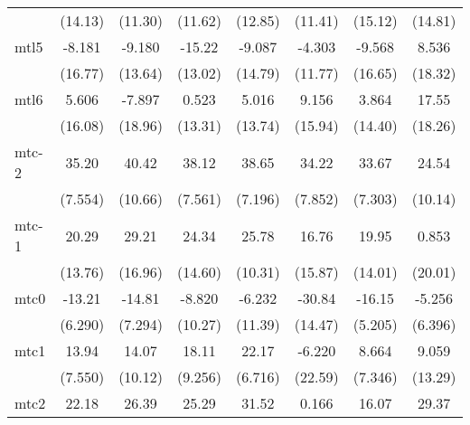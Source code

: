 \documentclass{article}
\begin{document}
{\begin{longtable}{l*{7}{c}}
                &  (14.13)         &  (11.30)         &  (11.62)         &  (12.85)         &  (11.41)         &  (15.12)         &  (14.81)         \\
mtl5            &   -8.181         &   -9.180         &   -15.22         &   -9.087         &   -4.303         &   -9.568         &    8.536         \\
                &  (16.77)         &  (13.64)         &  (13.02)         &  (14.79)         &  (11.77)         &  (16.65)         &  (18.32)         \\
mtl6            &    5.606         &   -7.897         &    0.523         &    5.016         &    9.156         &    3.864         &    17.55         \\
                &  (16.08)         &  (18.96)         &  (13.31)         &  (13.74)         &  (15.94)         &  (14.40)         &  (18.26)         \\
mtc-2           &    35.20\sym{**} &    40.42\sym{*}  &    38.12\sym{**} &    38.65\sym{**} &    34.22\sym{**} &    33.67\sym{**} &    24.54         \\
                &  (7.554)         &  (10.66)         &  (7.561)         &  (7.196)         &  (7.852)         &  (7.303)         &  (10.14)         \\
mtc-1           &    20.29         &    29.21         &    24.34         &    25.78         &    16.76         &    19.95         &    0.853         \\
                &  (13.76)         &  (16.96)         &  (14.60)         &  (10.31)         &  (15.87)         &  (14.01)         &  (20.01)         \\
mtc0            &   -13.21         &   -14.81         &   -8.820         &   -6.232         &   -30.84         &   -16.15\sym{*}  &   -5.256         \\
                &  (6.290)         &  (7.294)         &  (10.27)         &  (11.39)         &  (14.47)         &  (5.205)         &  (6.396)         \\
mtc1            &    13.94         &    14.07         &    18.11         &    22.17\sym{*}  &   -6.220         &    8.664         &    9.059         \\
                &  (7.550)         &  (10.12)         &  (9.256)         &  (6.716)         &  (22.59)         &  (7.346)         &  (13.29)         \\
mtc2            &    22.18         &    26.39         &    25.29         &    31.52\sym{*}  &    0.166         &    16.07         &    29.37         \\

\end{longtable}}
\end{document}
